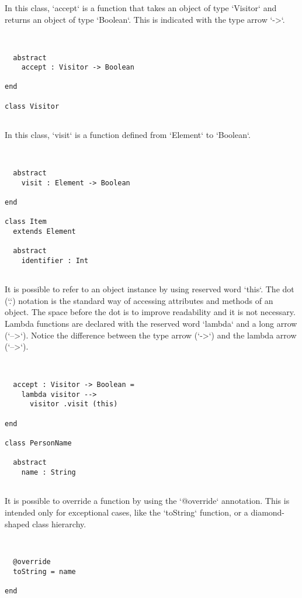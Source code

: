 \documentclass[12pt,a4paper]{article}
\begin{document}
  In this class, `accept` is a function that takes an object of type `Visitor` and returns
   an object of type `Boolean`. This is indicated with the type arrow `->`.


\begin{lstlisting}


  abstract
    accept : Visitor -> Boolean

end

class Visitor


\end{lstlisting}

  In this class, `visit` is a function defined from `Element` to `Boolean`.


\begin{lstlisting}


  abstract
    visit : Element -> Boolean

end

class Item
  extends Element

  abstract
    identifier : Int


\end{lstlisting}

  It is possible to refer to an object instance by using reserved word `this`.
   The dot (`.`) notation is the standard way of accessing attributes and methods of an
   object. The space before the dot is to improve readability and it is not necessary.
   Lambda functions are declared with the reserved word `lambda` and a long arrow (`-->`).
   Notice the difference between the type arrow (`->`) and the lambda arrow (`-->`).


\begin{lstlisting}


  accept : Visitor -> Boolean =
    lambda visitor -->
      visitor .visit (this)

end

class PersonName

  abstract
    name : String


\end{lstlisting}

  It is possible to override a function by using the `@override` annotation.
   This is intended only for exceptional cases, like the `toString` function, or a
   diamond-shaped class hierarchy.


\begin{lstlisting}


  @override
  toString = name

end


\end{lstlisting}
\end{document}
